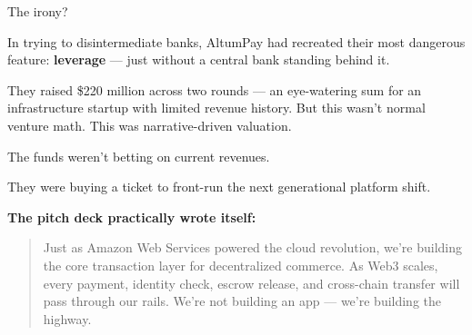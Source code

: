 \medskip

The irony?

In trying to disintermediate banks, AltumPay had recreated their most dangerous feature:  
\textbf{leverage} — just without a central bank standing behind it.

They raised \$220 million across two rounds --- an eye-watering sum for an infrastructure startup with limited revenue history. But this wasn’t normal venture math. This was narrative-driven valuation.

The funds weren’t betting on current revenues.  

They were buying a ticket to front-run the next generational platform shift.

\medskip

\textbf{The pitch deck practically wrote itself:}

\begin{quote}
Just as Amazon Web Services powered the cloud revolution,  
we’re building the core transaction layer for decentralized commerce.  
As Web3 scales, every payment, identity check, escrow release, and cross-chain transfer will pass through our rails.  
We’re not building an app --- we’re building the highway.
\end{quote}

